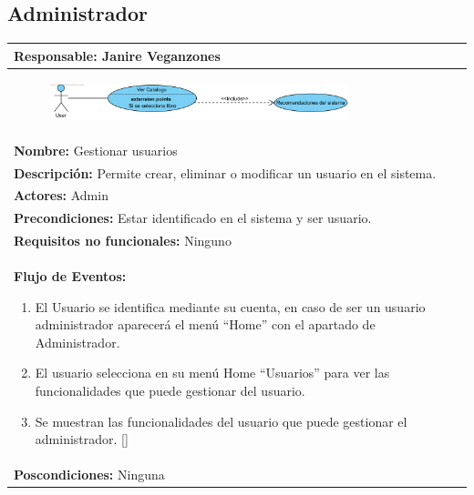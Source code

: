\documentclass{report}
\begin{document}
        \subsection{Administrador}
        \begin{center}
            \begin{longtable}{|p{\linewidth}|}
                \hline
                \textbf{Responsable:} Janire Veganzones\\
                \hline
                \begin{figure}[H]
                    \centering
                    \includegraphics[width=0.8\textwidth]{./img/casos_uso/RecomendacionesLibros.png}
                \end{figure}\\
                \hline
                \textbf{Nombre:} Gestionar usuarios\\
                \hline
                \textbf{Descripción:}  Permite crear, eliminar o modificar un usuario en el sistema.\\
                \hline
                \textbf{Actores:} Admin\\
                \hline
                \textbf{Precondiciones:} Estar identificado en el sistema y ser usuario.\\
                \hline
                \textbf{Requisitos no funcionales:} Ninguno\\
                \hline
                \textbf{Flujo de Eventos:}
                \begin{enumerate}
                    \item El Usuario se identifica mediante su cuenta, en caso de ser un usuario administrador aparecerá el menú “Home” con el apartado de Administrador.
                    \item El usuario selecciona en su menú Home “Usuarios” para ver las funcionalidades que puede gestionar del usuario.
                    \item Se muestran las funcionalidades del usuario que puede gestionar el administrador.  
                    []
                \end{enumerate}\\
                \hline
                \textbf{Poscondiciones:} Ninguna\\
                \hline

\end{longtable}
\end{center}
\end{document}
